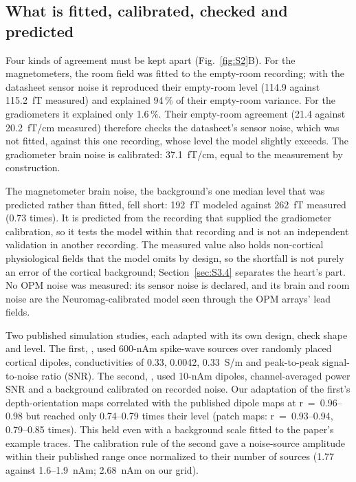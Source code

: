 \documentclass[preprint,12pt,authoryear,a4paper]{elsarticle}
\begin{document}
\subsection{What is fitted, calibrated, checked and predicted}\label{sec:S3.2}

Four kinds of agreement must be kept apart (Fig.~\ref{fig:S2}B). For the magnetometers, the room field was fitted to the empty-room recording; with the datasheet sensor noise it reproduced their empty-room level (114.9 against 115.2~fT measured) and explained 94\,\% of their empty-room variance. For the gradiometers it explained only 1.6\,\%. Their empty-room agreement (21.4 against 20.2~fT/cm measured) therefore checks the datasheet's sensor noise, which was not fitted, against this one recording, whose level the model slightly exceeds. The gradiometer brain noise is calibrated: 37.1~fT/cm, equal to the measurement by construction.

The magnetometer brain noise, the background's one median level that was predicted rather than fitted, fell short: 192~fT modeled against 262~fT measured (0.73 times). It is predicted from the recording that supplied the gradiometer calibration, so it tests the model within that recording and is not an independent validation in another recording. The measured value also holds non-cortical physiological fields that the model omits by design, so the shortfall is not purely an error of the cortical background; Section~\ref{sec:S3.4} separates the heart's part. No OPM noise was measured: its sensor noise is declared, and its brain and room noise are the Neuromag-calibrated model seen through the OPM arrays' lead fields.

Two published simulation studies, each adapted with its own design, check shape and level. The first, \citet{hunold2016}, used 600-nAm spike-wave sources over randomly placed cortical dipoles, conductivities of 0.33, 0.0042, 0.33~S/m and peak-to-peak signal-to-noise ratio (SNR). The second, \citet{goldenholz2009}, used 10-nAm dipoles, channel-averaged power SNR and a background calibrated on recorded noise. Our adaptation of the first's depth-orientation maps correlated with the published dipole maps at r~=~0.96–0.98 but reached only 0.74–0.79 times their level (patch maps: r~=~0.93–0.94, 0.79–0.85 times). This held even with a background scale fitted to the paper's example traces. The calibration rule of the second gave a noise-source amplitude within their published range once normalized to their number of sources (1.77 against 1.6–1.9~nAm; 2.68~nAm on our grid).
\end{document}

